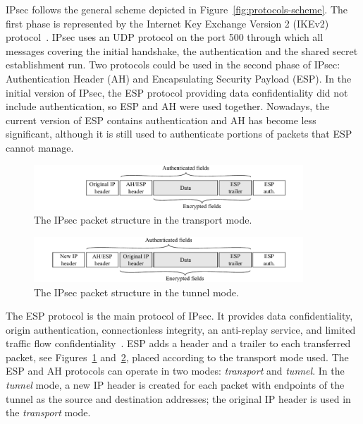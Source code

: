 IPsec follows the general scheme depicted in Figure~\ref{fig:protocols-scheme}. The first phase is represented by the Internet Key Exchange Version 2 (IKEv2) protocol~\cite{rfc5996}. IPsec uses an UDP protocol on the port 500 through which all messages covering the initial handshake, the authentication and the shared secret establishment run. Two protocols could be used in the second phase of IPsec: Authentication Header (AH) and Encapsulating Security Payload (ESP). In the initial version of IPsec, the ESP protocol providing data confidentiality did not include authentication, so ESP and AH were used together. Nowadays, the current version of ESP contains authentication and AH has become less significant, although it is still used to authenticate portions of packets that ESP cannot manage.



\begin{figure}[!ht]
  \centering
  \includegraphics[width=0.9\textwidth]{figures/ipsec_transport_mode}
  \caption{The IPsec packet structure in the transport mode.}
  \label{fig:ipsec-transport-mode}
\end{figure}

\begin{figure}[!ht]
  \centering
  \includegraphics[width=0.9\textwidth]{figures/ipsec_tunnel_mode}
  \caption{The IPsec packet structure in the tunnel mode.}
  \label{fig:ipsec-tunnel-mode}
\end{figure}

The ESP protocol is the main protocol of IPsec. It provides data confidentiality, origin authentication, connectionless integrity, an anti-replay service, and limited traffic flow confidentiality~\cite{rfc4303}. ESP adds a header and a trailer to each transferred packet, see Figures~\ref{fig:ipsec-transport-mode} and~\ref{fig:ipsec-tunnel-mode}, placed according to the transport mode used. The ESP and AH protocols can operate in two modes: \textit{transport} and \textit{tunnel}. In the \textit{tunnel} mode, a new IP header is created for each packet with endpoints of the tunnel as the source and destination addresses; the original IP header is used in the \textit{transport} mode.



